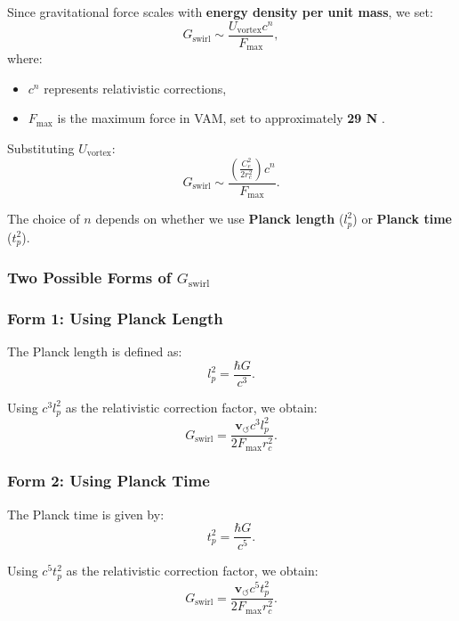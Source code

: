 \documentclass[a4paper,10pt]{article}
\begin{document}
Since gravitational force scales with \textbf{energy density per unit mass}, we set:
\begin{equation*}
     G_\text{swirl} \sim \frac{U_\text{vortex} c^n}{F_{\max}},
\end{equation*}
where:
\begin{itemize}
    \item \( c^n \) represents relativistic corrections,
    \item \( F_{\max} \) is the maximum force in VAM, set to approximately \textbf{29 N} \cite{schiller_max_force}.
\end{itemize}

Substituting \( U_\text{vortex} \):
\begin{equation*}
     G_\text{swirl} \sim \frac{\left( \frac{C_e^2}{2 r_c^2} \right) c^n}{F_{\max}}.
\end{equation*}

The choice of \( n \) depends on whether we use \textbf{Planck length} (\( l_p^2 \)) or \textbf{Planck time} (\( t_p^2 \)).

\subsubsection*{Two Possible Forms of \(  G_\text{swirl} \)}
\subsubsection*{Form 1: Using Planck Length}
The Planck length is defined as:
\begin{equation*}
    l_p^2 = \frac{\hbar G}{c^3}.
\end{equation*}

Using \( c^3 l_p^2 \) as the relativistic correction factor, we obtain:
\begin{equation*}
     G_\text{swirl} = \frac{\mathbf{v}_{\scriptscriptstyle\boldsymbol{\circlearrowleft}} c^3 l_p^2}{2 F_{\max} r_c^2}.
\end{equation*}

\subsubsection*{Form 2: Using Planck Time}
The Planck time is given by:
\begin{equation*}
    t_p^2 = \frac{\hbar G}{c^5}.
\end{equation*}

Using \( c^5 t_p^2 \) as the relativistic correction factor, we obtain:
\begin{equation*}
     G_\text{swirl} = \frac{\mathbf{v}_{\scriptscriptstyle\boldsymbol{\circlearrowleft}} c^5 t_p^2}{2 F_{\max} r_c^2}.
\end{equation*}
\end{document}
